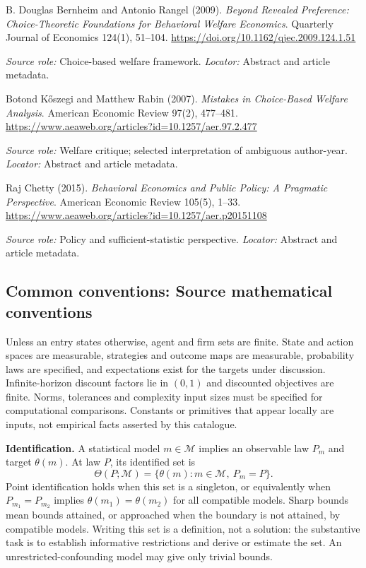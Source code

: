 \documentclass[11pt,a4paper]{article}
\begin{document}
\begin{enumerate}[label={[S\arabic*]},leftmargin=*]

\item B. Douglas Bernheim and Antonio Rangel (2009). \emph{Beyond Revealed Preference: Choice-Theoretic Foundations for Behavioral Welfare Economics}. Quarterly Journal of Economics 124(1), 51--104. \url{https://doi.org/10.1162/qjec.2009.124.1.51}\par \textit{Source role:} Choice-based welfare framework. \textit{Locator:} Abstract and article metadata.

\item Botond Kőszegi and Matthew Rabin (2007). \emph{Mistakes in Choice-Based Welfare Analysis}. American Economic Review 97(2), 477--481. \url{https://www.aeaweb.org/articles?id=10.1257/aer.97.2.477}\par \textit{Source role:} Welfare critique; selected interpretation of ambiguous author-year. \textit{Locator:} Abstract and article metadata.

\item Raj Chetty (2015). \emph{Behavioral Economics and Public Policy: A Pragmatic Perspective}. American Economic Review 105(5), 1--33. \url{https://www.aeaweb.org/articles?id=10.1257/aer.p20151108}\par \textit{Source role:} Policy and sufficient-statistic perspective. \textit{Locator:} Abstract and article metadata.

\end{enumerate}

\subsection*{Common conventions: Source mathematical conventions}

Unless an entry states otherwise, agent and firm sets are finite. State and action spaces are measurable, strategies and outcome maps are measurable, probability laws are specified, and expectations exist for the targets under discussion. Infinite-horizon discount factors lie in $(0,1)$ and discounted objectives are finite. Norms, tolerances and complexity input sizes must be specified for computational comparisons. Constants or primitives that appear locally are inputs, not empirical facts asserted by this catalogue.

\textbf{Identification.} A statistical model $m\in\mathcal M$ implies an observable law $P_m$ and target $\theta(m)$. At law $P$, its identified set is
\[
\Theta(P;\mathcal M)=\{\theta(m):m\in\mathcal M,\ P_m=P\}.
\]
Point identification holds when this set is a singleton, or equivalently when $P_{m_1}=P_{m_2}$ implies $\theta(m_1)=\theta(m_2)$ for all compatible models. Sharp bounds mean bounds attained, or approached when the boundary is not attained, by compatible models. Writing this set is a definition, not a solution: the substantive task is to establish informative restrictions and derive or estimate the set. An unrestricted-confounding model may give only trivial bounds.
\end{document}

